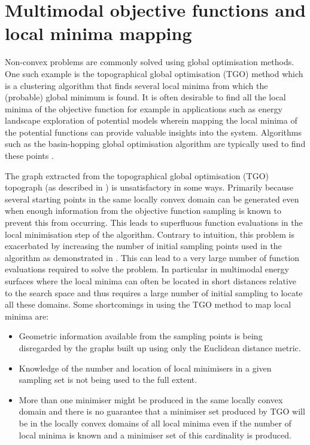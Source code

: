 \section{Multimodal objective functions and local minima mapping}
Non-convex problems are commonly solved using global optimisation methods. One such example is the topographical global optimisation (TGO) method \cite{Henderson2015, Torn1986, Torn1990, Torn1992} which is a clustering algorithm that finds several local minima from which the (probable) global minimum is found. It is often desirable to find all the local minima of the objective function for example in applications such as energy landscape exploration of potential models wherein mapping the local minima of the potential functions can provide valuable insights into the system. Algorithms such as the basin-hopping global optimisation algorithm are typically used to find these points \citep{Wales2015}.





The graph extracted from the topographical global optimisation (TGO) \cite{Henderson2015, Torn1986, Torn1990, Torn1992} topograph (as described in ) is unsatisfactory in some ways. Primarily because several starting points in the same locally convex domain can be generated even when enough information from the objective function sampling is known to prevent this from occurring. This leads to superfluous function evaluations in the local minimisation step of the algorithm. Contrary to intuition, this problem is exacerbated by increasing the number of initial sampling points used in the algorithm as demonstrated in . This can lead to a very large number of function evaluations required to solve the problem. In particular in multimodal energy surfaces where the local minima can often be located in short distances relative to the search space \cite{Zhang2011} and thus requires a large number of initial sampling to locate all these domains. Some shortcomings in using the TGO method to map local minima are:
\begin{itemize}
\item Geometric information available from the sampling points is being disregarded by the graphs built up using only the Euclidean distance metric.
\item Knowledge of the number and location of local minimisers in a given sampling set is not being used to the full extent.
\item More than one minimiser might be produced in the same locally convex domain and there is no guarantee that a minimiser set produced by TGO will be in the locally convex domains of all local minima even if the number of local minima is known and a minimiser set of this cardinality is produced.
\end{itemize}

